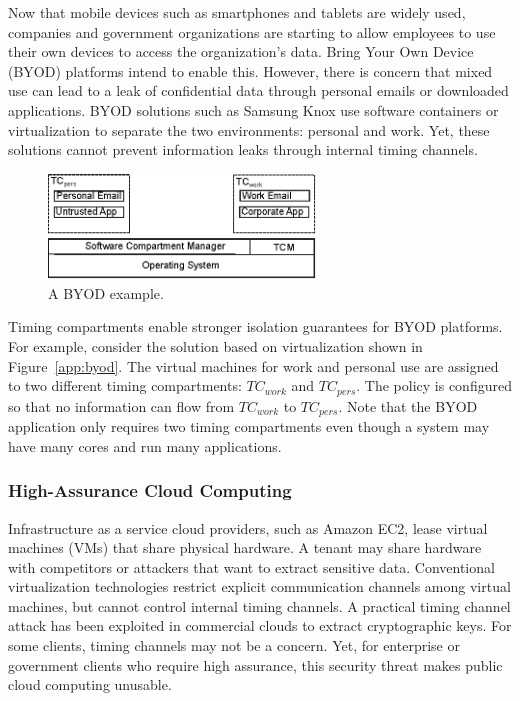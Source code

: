 Now that mobile devices such as smartphones and tablets are widely used, 
companies and government organizations are starting to allow employees to
use their own devices to access the organization's data.
Bring Your Own Device (BYOD) platforms intend to enable this. However, there is 
concern that mixed use can lead to a leak of confidential data through personal 
emails or
downloaded applications. BYOD solutions such as Samsung Knox use
software containers or virtualization to separate the two environments:
personal and work. Yet, these solutions cannot prevent information leaks
through internal timing channels.

\begin{figure}
    \begin{center}
        \includegraphics[width=2.79in]{figs/byod.eps}
        \caption{A BYOD example.}
        \label{fig:byod}
    \end{center}
\end{figure}

Timing compartments enable stronger isolation guarantees for BYOD
platforms. For example, consider the solution based on virtualization shown in 
Figure~\ref{app:byod}. The virtual machines for
work and personal use are assigned to two different timing compartments:
$TC_{work}$ and $TC_{pers}$. The policy is configured so that no information can 
flow from $TC_{work}$ to $TC_{pers}$.
Note that the BYOD application only requires two timing compartments even
though a system may have many cores and run many applications.

\subsubsection{High-Assurance Cloud Computing}

Infrastructure as a service cloud providers, such as Amazon EC2, lease virtual 
machines (VMs) that share physical hardware. 
A tenant may share hardware with competitors or attackers that want
to extract sensitive data. Conventional virtualization technologies restrict 
explicit
communication channels among virtual machines, but cannot control internal
timing channels. A practical timing channel attack has been exploited
in commercial clouds to extract cryptographic keys\cite{heyyou}.
For some clients, timing channels may not be a concern. Yet, for enterprise or 
government clients who require high assurance,
this security threat makes public cloud computing unusable. 

